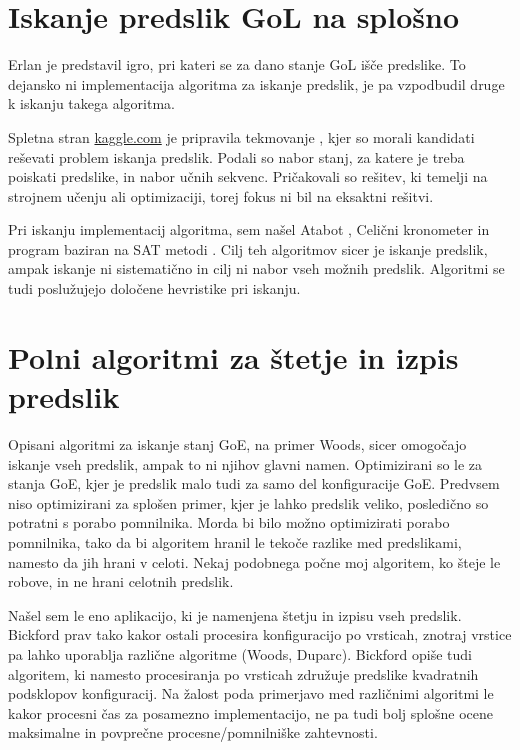 \documentclass[12pt,a4paper,openany,twoside]{book}
\begin{document}
\section{Iskanje predslik GoL na splošno}

Erlan \cite{Erlan2012} je predstavil igro, pri kateri se za dano stanje
GoL išče predslike. To dejansko ni implementacija algoritma za iskanje predslik,
je pa vzpodbudil druge k iskanju takega algoritma.

Spletna stran \url{kaggle.com} je pripravila tekmovanje \cite{kaggle2013},
kjer so morali kandidati reševati problem iskanja predslik. Podali so
nabor stanj, za katere je treba poiskati predslike, in nabor učnih sekvenc.
Pričakovali so rešitev, ki temelji na strojnem učenju ali optimizaciji,
torej fokus ni bil na eksaktni rešitvi.

Pri iskanju implementacij algoritma, sem našel Atabot \cite{Borah2013},
Celični kronometer \cite{Duxbury2013} in program baziran na SAT metodi \cite{Pigorsch2015}.
Cilj teh algoritmov sicer je iskanje predslik, ampak iskanje ni sistematično
in cilj ni nabor vseh možnih predslik.
Algoritmi se tudi poslužujejo določene hevristike pri iskanju.

\section{Polni algoritmi za štetje in izpis predslik}

Opisani algoritmi za iskanje stanj GoE, na primer Woods,
sicer omogočajo iskanje vseh predslik, ampak to ni njihov glavni namen.
Optimizirani so le za stanja GoE, kjer je predslik malo tudi za samo del konfiguracije GoE.
Predvsem niso optimizirani za splošen primer, kjer je lahko predslik veliko,
posledično so potratni s porabo pomnilnika.
Morda bi bilo možno optimizirati porabo pomnilnika,
tako da bi algoritem hranil le tekoče razlike med predslikami, namesto da jih hrani v celoti.
Nekaj podobnega počne moj algoritem, ko šteje le robove, in ne hrani celotnih predslik.

Našel sem le eno aplikacijo, ki je namenjena štetju in izpisu vseh predslik.
Bickford \cite{Bickford2012} prav tako kakor ostali procesira konfiguracijo
po vrsticah, znotraj vrstice pa lahko uporablja različne algoritme (Woods, Duparc).
Bickford opiše tudi algoritem, ki namesto procesiranja po vrsticah združuje predslike
kvadratnih podsklopov konfiguracij. Na žalost poda primerjavo med različnimi algoritmi
le kakor procesni čas za posamezno implementacijo, ne pa tudi bolj splošne
ocene maksimalne in povprečne procesne/pomnilniške zahtevnosti.
\end{document}
